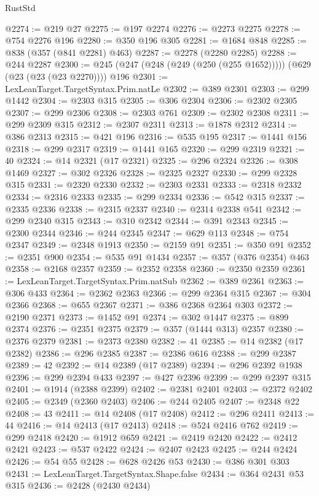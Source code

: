 \begin{lexlean}{RustStd}
\begin{coremodule}
@2274 := @219 @27
@2275 := @197 @2274
@2276 := @2273 @2275
@2278 := @754 @2276 @196
@2280 := @350 @196 @305
@2281 := @1684 @848
@2285 := @838 (@357 (@841 @2281) @463)
@2287 := @2278 (@2280 @2285)
@2288 := @244 @2287
@2300 := @245 (@247 (@248 (@249 (@250 (@255 @1652))))) (@629 (@23 (@23 (@23 @2270)))) @196
@2301 := LexLeanTarget.TargetSyntax.Prim.natLe
@2302 := @389 @2301
@2303 := @299 @1442
@2304 := @2303 @315
@2305 := @306 @2304
@2306 := @2302 @2305
@2307 := @299 @2306
@2308 := @2303 @761
@2309 := @2302 @2308
@2311 := @299 @2309 @315
@2312 := @2307 @2311
@2313 := @1878 @2312
@2314 := @386 @2313
@2315 := @421 @196
@2316 := @535 @195
@2317 := @1441 @156
@2318 := @299 @2317
@2319 := @1441 @165
@2320 := @299 @2319
@2321 := 40
@2324 := @14 @2321 (@17 @2321)
@2325 := @296 @2324
@2326 := @308 @1469
@2327 := @302 @2326
@2328 := @2325 @2327
@2330 := @299 @2328 @315
@2331 := @2320 @2330
@2332 := @2303 @2331
@2333 := @2318 @2332
@2334 := @2316 @2333
@2335 := @299 @2334
@2336 := @542 @315
@2337 := @2335 @2336
@2338 := @2315 @2337
@2340 := @2314 @2338 @541
@2342 := @299 @2340 @315
@2343 := @310 @2342
@2344 := @391 @2343
@2345 := @2300 @2344
@2346 := @244 @2345
@2347 := @629 @113
@2348 := @754 @2347
@2349 := @2348 @1913
@2350 := @2159 @91
@2351 := @350 @91
@2352 := @2351 @900
@2354 := @535 @91 @1434
@2357 := @357 (@376 @2354) @463
@2358 := @2168 @2357
@2359 := @2352 @2358
@2360 := @2350 @2359
@2361 := LexLeanTarget.TargetSyntax.Prim.natSub
@2362 := @389 @2361
@2363 := @306 @433
@2364 := @2362 @2363
@2366 := @299 @2364 @315
@2367 := @304 @2366
@2368 := @655 @2367
@2371 := @386 @2368 @2364 @303
@2372 := @2190 @2371
@2373 := @1452 @91
@2374 := @302 @1447
@2375 := @899 @2374
@2376 := @2351 @2375
@2379 := @357 (@1444 @313) @2357
@2380 := @2376 @2379
@2381 := @2373 @2380
@2382 := 41
@2385 := @14 @2382 (@17 @2382)
@2386 := @296 @2385
@2387 := @2386 @616
@2388 := @299 @2387
@2389 := 42
@2392 := @14 @2389 (@17 @2389)
@2394 := @296 @2392 @1938
@2396 := @299 @2394 @433
@2397 := @427 @2396
@2399 := @299 @2397 @315
@2401 := @1914 (@2388 @2399)
@2402 := @2381 @2401
@2403 := @2372 @2402
@2405 := @2349 (@2360 @2403)
@2406 := @244 @2405
@2407 := @2348 @22
@2408 := 43
@2411 := @14 @2408 (@17 @2408)
@2412 := @296 @2411
@2413 := 44
@2416 := @14 @2413 (@17 @2413)
@2418 := @524 @2416 @762
@2419 := @299 @2418
@2420 := @1912 @659
@2421 := @2419 @2420
@2422 := @2412 @2421
@2423 := @537 @2422
@2424 := @2407 @2423
@2425 := @244 @2424
@2426 := @54 @55
@2428 := @628 @2426 @53
@2430 := @386 @301 @303
@2431 := LexLeanTarget.TargetSyntax.Shape.false
@2434 := @364 @2431 @53 @315
@2436 := @2428 (@2430 @2434)

\end{coremodule}
\end{lexlean}
